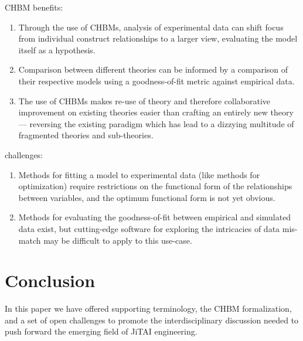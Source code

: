 \documentclass[runningheads,a4paper]{llncs}
\begin{document}
CHBM benefits:
\begin{enumerate}
    \item Through the use of CHBMs, analysis of experimental data can shift focus from individual construct relationships to a larger view, evaluating the model itself as a hypothesis.
    \item Comparison between different theories can be informed by a comparison of their respective models using a goodness-of-fit metric against empirical data.
    \item The use of CHBMs makes re-use of theory and therefore collaborative improvement on existing theories easier than crafting an entirely new theory --- reversing the existing paradigm which has lead to a dizzying multitude of fragmented theories and sub-theories.
\end{enumerate}

challenges:
\begin{enumerate}
    \item Methods for fitting a model to experimental data (like methods for optimization) require restrictions on the functional form of the relationships between variables, and the optimum functional form is not yet obvious.
    \item Methods for evaluating the goodness-of-fit between empirical and simulated data exist, but cutting-edge software for exploring the intricacies of data mis-match may be difficult to apply to this use-case.
\end{enumerate}

\section{Conclusion}
In this paper we have offered supporting terminology, the CHBM formalization, and a set of open challenges to promote the interdisciplinary discussion needed to push forward the emerging field of JiTAI engineering.

\end{document}
